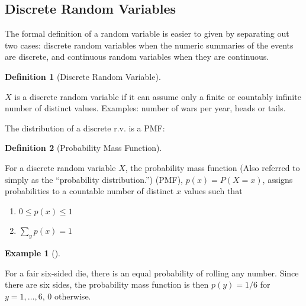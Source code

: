 \documentclass[
  letterpaper,
]{book}
\providecommand{\tightlist}{%
  \setlength{\itemsep}{0pt}\setlength{\parskip}{0pt}}\usepackage{longtable,booktabs,array}
\theoremstyle{definition}
\newtheorem{definition}{Definition}[chapter]
\theoremstyle{definition}
\newtheorem{example}{Example}[chapter]
\theoremstyle{plain}
\theoremstyle{definition}
\theoremstyle{plain}
\theoremstyle{plain}
\theoremstyle{remark}
\begin{document}
\hypertarget{discrete-random-variables}{%
\subsection*{Discrete Random
Variables}\label{discrete-random-variables}}

The formal definition of a random variable is easier to given by
separating out two cases: discrete random variables when the numeric
summaries of the events are discrete, and continuous random variables
when they are continuous.

\leavevmode{}%
\begin{definition}[Discrete Random Variable]\label{def-}

\(X\) is a discrete random variable if it can assume only a finite or
countably infinite number of distinct values. Examples: number of wars
per year, heads or tails.

\end{definition}

The distribution of a discrete r.v. is a PMF:

\leavevmode{}%
\begin{definition}[Probability Mass Function]\label{def-}

For a discrete random variable \(X\), the probability mass function
(Also referred to simply as the ``probability distribution.'') (PMF),
\(p(x)=P(X=x)\), assigns probabilities to a countable number of distinct
\(x\) values such that

\begin{enumerate}
\def\labelenumi{\arabic{enumi}.}
\tightlist
\item
  \(0\le p(x)\le 1\)
\item
  \(\sum\limits_y p(x)=1\)
\end{enumerate}

\end{definition}

\leavevmode{}%
\begin{example}[]\label{exm-}

For a fair six-sided die, there is an equal probability of rolling any
number. Since there are six sides, the probability mass function is then
\(p(y)=1/6\) for \(y=1,\ldots,6\), 0 otherwise.

\end{example}
\end{document}
